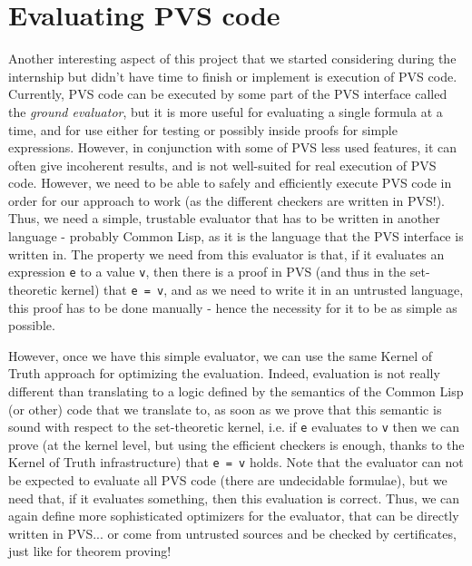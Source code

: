 \documentclass[utf8,a4paper]{article}
\begin{document}
\section{Evaluating PVS code}
\label{sec:eval}

Another interesting aspect of this project that we started considering
during the internship but didn't have time to finish or implement is
execution of PVS code. Currently, PVS code can be executed by some
part of the PVS interface called the \textit{ground evaluator}, but it
is more useful for evaluating a single formula at a time, and for use
either for testing or possibly inside proofs for simple
expressions. However, in conjunction with some of PVS less used
features, it can often give incoherent results, and is not well-suited
for real execution of PVS code. However, we need to be able to safely
and efficiently execute PVS code in order for our approach to work (as
the different checkers are written in PVS!). Thus, we need a simple,
trustable evaluator that has to be written in another language -
probably Common Lisp, as it is the language that the PVS interface is
written in. The property we need from this evaluator is that, if it
evaluates an expression \verb!e! to a value \verb!v!, then there is a
proof in PVS (and thus in the set-theoretic kernel) that \verb!e = v!,
and as we need to write it in an untrusted language, this proof has to
be done manually - hence the necessity for it to be as simple as
possible.

However, once we have this simple evaluator, we can use the same
Kernel of Truth approach for optimizing the evaluation. Indeed,
evaluation is not really different than translating to a logic defined
by the semantics of the Common Lisp (or other) code that we translate
to, as soon as we prove that this semantic is sound with respect to
the set-theoretic kernel, i.e. if \verb!e! evaluates to \verb!v! then
we can prove (at the kernel level, but using the efficient checkers is
enough, thanks to the Kernel of Truth infrastructure) that
\verb!e = v! holds. Note that the evaluator can not be expected to
evaluate all PVS code (there are undecidable formulae), but we need
that, if it evaluates something, then this evaluation is
correct. Thus, we can again define more sophisticated optimizers for
the evaluator, that can be directly written in PVS... or come from
untrusted sources and be checked by certificates, just like for
theorem proving!
\end{document}
